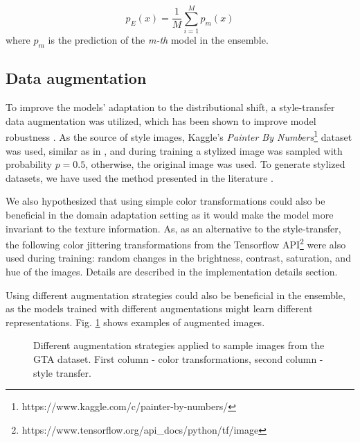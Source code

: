 \documentclass[conference]{IEEEtran}
\begin{document}
\begin{equation}
p_E(x) = \frac{1}{M} \sum_{i=1}^M p_m(x)
\end{equation}
where $p_m$ is the prediction of the \textit{m-th} model in the ensemble.

\subsection{Data augmentation}
To improve the models’ adaptation to the distributional shift, a style-transfer data augmentation was utilized, which has been shown to improve model robustness \cite{cnnbiased, Cygert}. As the source of style images, Kaggle's \textit{Painter By Numbers}\footnote{https://www.kaggle.com/c/painter-by-numbers/} dataset was used, similar as in \cite{cnnbiased}, and during training a stylized image was sampled with probability $p = 0.5$, otherwise, the original image was used. To generate stylized datasets, we have used the method presented in the literature \cite{style_transfer}. 

We also hypothesized that using simple color transformations could also be beneficial in the domain adaptation setting as it would make the model more invariant to the texture information. As, as an alternative to the style-transfer, the following color jittering transformations from the Tensorflow API\footnote{https://www.tensorflow.org/api\_docs/python/tf/image} were also used during training: random changes in the brightness, contrast, saturation, and hue of the images. Details are described in the implementation details section.

Using different augmentation strategies could also be beneficial in the ensemble, as the models trained with different augmentations might learn different representations. Fig. \ref{fig:fig1} shows examples of augmented images.

\begin{figure}[t]%
\centering
{} 
\vspace{-3mm}
\hspace{0mm}
\caption{Different augmentation strategies applied to sample images from the GTA dataset. First column - color transformations, second column - style transfer.}
\label{fig:fig1}
\end{figure}
\end{document}
